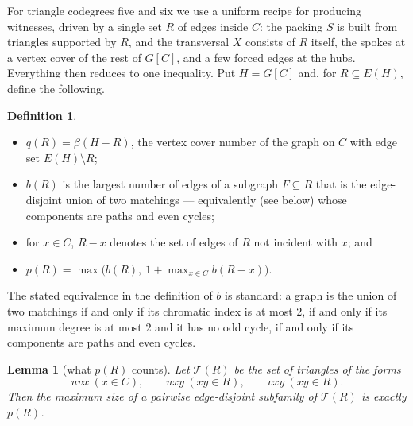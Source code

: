 \documentclass[11pt,a4paper]{amsart}
\theoremstyle{plain}
\newtheorem{lemma}[theorem]{Lemma}
\theoremstyle{definition}
\newtheorem{definition}[theorem]{Definition}
\newcommand{\vc}{\beta}
\begin{document}
For triangle codegrees five and six we use a uniform recipe for producing
witnesses, driven by a single set $R$ of edges inside $C$: the packing $S$ is
built from triangles supported by $R$, and the transversal $X$ consists of $R$
itself, the spokes at a vertex cover of the rest of $G[C]$, and a few forced
edges at the hubs. Everything then reduces to one inequality. Put $H=G[C]$ and,
for $R\subseteq E(H)$, define the following.

\begin{definition}\label{def:template}
\phantom{.}
\begin{itemize}
  \item $q(R)=\vc(H-R)$, the vertex cover number of the graph on $C$ with edge
    set $E(H)\setminus R$;
  \item $b(R)$ is the largest number of edges of a subgraph $F\subseteq R$
    that is the edge-disjoint union of two matchings --- equivalently
    (see below) whose components are paths and even cycles;
  \item for $x\in C$, $R-x$ denotes the set of edges of $R$ not incident with
    $x$; and
  \item $p(R)=\max\bigl(b(R),\ 1+\max_{x\in C}b(R-x)\bigr)$.
\end{itemize}
\end{definition}

The stated equivalence in the definition of $b$ is standard: a graph is the
union of two matchings if and only if its chromatic index is at most $2$, if
and only if its maximum degree is at most $2$ and it has no odd cycle, if and
only if its components are paths and even cycles.

\begin{lemma}[what $p(R)$ counts]\label{lem:packing}
Let $\mathcal{T}(R)$ be the set of triangles of the forms
\[
  uvx\ (x\in C),\qquad uxy\ (xy\in R),\qquad vxy\ (xy\in R).
\]
Then the maximum size of a pairwise edge-disjoint subfamily of
$\mathcal{T}(R)$ is exactly $p(R)$.
\end{lemma}
\end{document}
